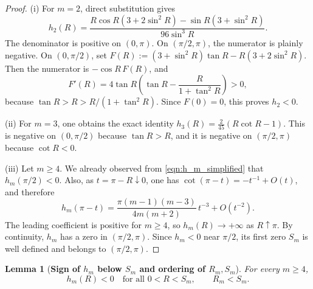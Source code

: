 \documentclass{amsart}
\newtheorem{lemma}[theorem]{Lemma}
\theoremstyle{definition}
\theoremstyle{remark}
\newcommand\0{\boldsymbol{0}}
\begin{document}
\begin{proof}
(i) For \(m=2\), direct substitution gives
\[
    h_2(R)=
    \frac{R\cos R(3+2\sin^2R)-\sin R(3+\sin^2R)}{96\sin^3R}.
\]
The denominator is positive on \((0,\pi)\). On \((\pi/2,\pi)\), the numerator is plainly negative.
On \((0,\pi/2)\), set \(F(R):=(3+\sin^2R)\tan R-R(3+2\sin^2R)\). Then the numerator is
\(-\cos R\,F(R)\), and
\[
    F'(R)=4\tan R\left(\tan R-\frac{R}{1+\tan^2R}\right)>0,
\]
because \(\tan R>R>R/(1+\tan^2R)\). Since \(F(0)=0\), this proves \(h_2<0\).

(ii) For \(m=3\), one obtains the exact identity \(h_3(R)=\frac{2}{45}(R\cot R-1)\). This is negative
on \((0,\pi/2)\) because \(\tan R>R\), and it is negative on \((\pi/2,\pi)\) because \(\cot R<0\).

(iii) Let \(m\ge4\). We already observed from \eqref{eqn:h_m_simplified} that \(h_m(\pi/2)<0\). Also,
as \(t=\pi-R\downarrow0\), one has \(\cot(\pi-t)=-t^{-1}+O(t)\), and therefore
\[
    h_m(\pi-t)
    =
    \frac{\pi(m-1)(m-3)}{4m(m+2)}\,t^{-3}+O(t^{-2}).
\]
The leading coefficient is positive for \(m\ge4\), so \(h_m(R)\to+\infty\) as \(R\uparrow\pi\).
By continuity, \(h_m\) has a zero in \((\pi/2,\pi)\). Since \(h_m<0\) near \(\pi/2\), its first zero
\(S_m\) is well defined and belongs to \((\pi/2,\pi)\).
\end{proof}

\begin{lemma}[\textbf{Sign of \(h_m\) below \(S_m\) and ordering of \(R_m,S_m\)}]
\label{lem:Rm-Sm-ordering}
For every \(m\ge4\),
\[
    \boxed{
    h_m(R)<0\quad\text{for all }0<R<S_m,
    \qquad
    R_m<S_m.
    }
\]
\end{lemma}
\end{document}
